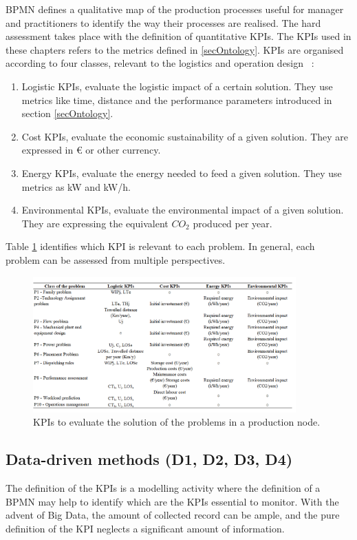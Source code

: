 BPMN defines a qualitative map of the production processes useful for manager and practitioners to identify the way their processes are realised. The hard assessment takes place with the definition of quantitative KPIs. The KPIs used in these chapters refers to the metrics defined in \ref{secOntology}. KPIs are organised according to four classes, relevant to the logistics and operation design ~\cite{Tufano2018}:

\begin{enumerate}
    \item Logistic KPIs, evaluate the logistic impact of a certain solution. They use metrics like time, distance and the performance parameters introduced in section \ref{secOntology}.
	\item Cost KPIs, evaluate the economic sustainability of a given solution. They are expressed in \euro{} or other currency.
	\item Energy KPIs, evaluate the energy needed to feed a given solution. They use metrics as kW and kW/h.
	\item Environmental KPIs, evaluate the environmental impact of a given solution. They are expressing the equivalent $CO_2$ produced per year.

\end{enumerate}

Table \ref{tab_prod_KPIs} identifies which KPI is relevant to each problem. In general, each problem can be assessed from multiple perspectives.

\begin{figure}[hbt!]
\centering
\includegraphics[width=0.9\textwidth]{sectionProduction/control_figures/tab_prod_KPIs.png}
\captionsetup{type=table}
\caption{KPIs to evaluate the solution of the problems in a production node.}
\label{tab_prod_KPIs}
\end{figure}

\subsection{Data-driven methods (D1, D2, D3, D4)}
The definition of the KPIs is a modelling activity where the definition of a BPMN may help to identify which are the KPIs essential to monitor. With the advent of Big Data, the amount of collected record can be ample, and the pure definition of the KPI neglects a significant amount of information.\par

